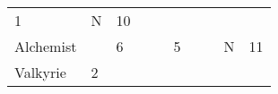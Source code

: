 \documentclass[12pt]{article}
\newcommand{\indexClass}[1]{\index{#1}}
\newcommand{\class}[1]{#1\indexClass{#1}}
\begin{document}
\begin{longtable}[]{@{}llllllllll@{}}
\begin{minipage}[t]{0.06\columnwidth}
1
\strut\end{minipage} &
\begin{minipage}[t]{0.07\columnwidth}\raggedright\strut
N
\strut\end{minipage} &
\begin{minipage}[t]{0.08\columnwidth}\raggedright\strut
10
\strut\end{minipage}\tabularnewline
\begin{minipage}[t]{0.13\columnwidth}\raggedright\strut
\class{Alchemist}
\strut\end{minipage} &
\begin{minipage}[t]{0.06\columnwidth}\raggedright\strut
\strut\end{minipage} &
\begin{minipage}[t]{0.06\columnwidth}\raggedright\strut
6
\strut\end{minipage} &
\begin{minipage}[t]{0.06\columnwidth}\raggedright\strut
\strut\end{minipage} &
\begin{minipage}[t]{0.06\columnwidth}\raggedright\strut
\strut\end{minipage} &
\begin{minipage}[t]{0.06\columnwidth}\raggedright\strut
5
\strut\end{minipage} &
\begin{minipage}[t]{0.06\columnwidth}\raggedright\strut
\strut\end{minipage} &
\begin{minipage}[t]{0.06\columnwidth}\raggedright\strut
\strut\end{minipage} &
\begin{minipage}[t]{0.07\columnwidth}\raggedright\strut
N
\strut\end{minipage} &
\begin{minipage}[t]{0.08\columnwidth}\raggedright\strut
11
\strut\end{minipage}\tabularnewline
\begin{minipage}[t]{0.13\columnwidth}\raggedright\strut
\class{Valkyrie}
\strut\end{minipage} &
\begin{minipage}[t]{0.06\columnwidth}\raggedright\strut
2
\strut\end{minipage} &
\begin{minipage}[t]{0.06\columnwidth}\raggedright\strut
\strut\end{minipage} &
\begin{minipage}[t]{0.06\columnwidth}\raggedright\strut

\end{minipage}
\end{longtable}
\end{document}
